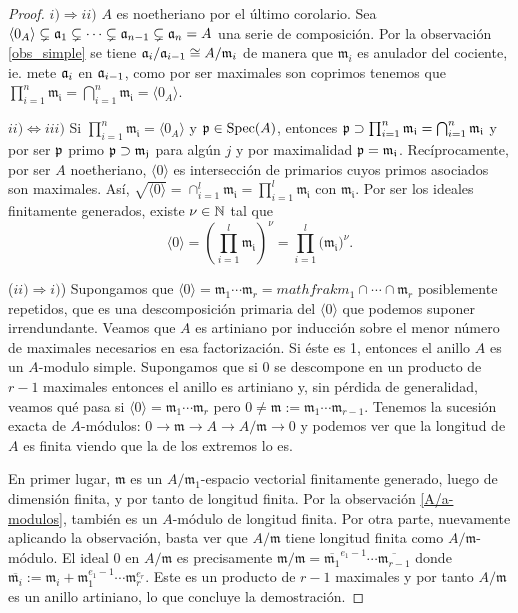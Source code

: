 \documentclass[../main.tex]{subfiles}
\begin{document}
\begin{proof} $i)\Rightarrow ii)$ $A$ es noetheriano por el último corolario. Sea $\langle 0_A\rangle\subsetneq \mathfrak{a}_1\subsetneq\cdots\subsetneq\mathfrak{a}_{n-1}\subsetneq\mathfrak{a}_n=A$ una serie de composición.
Por la observación \ref{obs_simple} se tiene $\mathfrak{a}_i/\mathfrak{a}_{i-1}\cong A/\mathfrak{m}_i$ de manera que $\mathfrak{m}_i$ es anulador del cociente, ie. mete $\mathfrak{a}_i$ en $\mathfrak{a}_{i-1}$, como por ser maximales son coprimos tenemos que $\prod_{i=1}^n\mathfrak{m_i}= \bigcap_{i=1}^n \mathfrak{m_i}=\langle 0_A\rangle$.

$ii)\Leftrightarrow iii)$ Si $\prod_{i=1}^n\mathfrak{m_i}=\langle 0_A\rangle$ y $\mathfrak{p}\in\text{Spec}(A)$, entonces $\mathfrak{p}\supset \prod_{i=1}^n\mathfrak{m_i}=\bigcap_{i=1}^n \mathfrak{m_i}$ y por ser $\mathfrak{p}$ primo $\mathfrak{p}\supset\mathfrak{m_j}$ para algún $j$ y por maximalidad $\mathfrak{p}=\mathfrak{m_i}$.
Recíprocamente, por ser $A$ noetheriano, $\langle 0\rangle$ es intersección de primarios cuyos primos asociados son maximales. Así, $\sqrt{\langle 0\rangle}=\cap_{i=1}^l\mathfrak{m_i} = \prod_{i=1}^l\mathfrak{m_i}$ con $\mathfrak{m_i}$. Por ser los ideales finitamente generados, existe $\nu\in\mathbb{N}$ tal que
$$\langle 0\rangle = \left(\prod_{i=1}^l\mathfrak{m_i}\right)^\nu=\prod_{i=1}^l(\mathfrak{m_i)^\nu}.$$

($ii)\Rightarrow i)$) Supongamos que $\langle 0\rangle=\mathfrak{m}_1\cdots\mathfrak{m}_r = mathfrak{m}_1\cap\cdots\cap \mathfrak{m}_r$ posiblemente repetidos, que es una descomposición primaria del $\langle 0\rangle$ que podemos suponer irrendundante. Veamos que $A$ es artiniano por inducción sobre el menor número de maximales necesarios en esa factorización. Si éste es 1, entonces el anillo $A$ es un $A$-modulo simple. Supongamos que si $0$ se descompone en un producto de $r-1$ maximales entonces el anillo es artiniano y, sin pérdida de generalidad, veamos qué pasa si $\langle 0\rangle=\mathfrak{m}_1\cdots\mathfrak{m}_r$ pero $0 \neq \mathfrak{m} := \mathfrak{m}_1\cdots\mathfrak{m}_{r-1}$.
Tenemos la sucesión exacta de $A$-módulos:
$0\rightarrow \mathfrak{m}\rightarrow A\rightarrow A/\mathfrak{m} \rightarrow 0$
y podemos ver que la longitud de $A$ es finita viendo que la de los extremos lo es.

En primer lugar, $\mathfrak{m}$ es un $A/\mathfrak{m}_1$-espacio vectorial finitamente generado, luego de dimensión finita, y por tanto de longitud finita. Por la observación \ref{A/a-modulos}, también es un $A$-módulo de longitud finita. Por otra parte, nuevamente aplicando la observación, basta ver que $A/\mathfrak{m}$ tiene longitud finita como $A/\mathfrak{m}$-módulo.
El ideal $0$ en $A/\mathfrak{m}$ es precisamente $ \mathfrak{m}/ \mathfrak{m} = \overline{\mathfrak{m}_1}^{e_1-1}\cdots\overline{\mathfrak{m}_{r-1}}$ donde $\overline{\mathfrak{m}_i}:=\mathfrak{m}_i+\mathfrak{m}_1^{e_1-1}\cdots\mathfrak{m}_r^{e_r}$.
Este es un producto de $r-1$ maximales y por tanto $A/\mathfrak{m}$ es un anillo artiniano, lo que concluye la demostración.
\end{proof}
\end{document}
